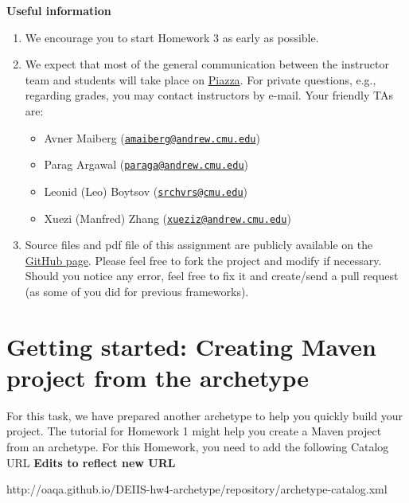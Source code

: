 \documentclass[oneside]{memoir}
\begin{document}
\textbf{Useful information}
\begin{enumerate}
\item We encourage you to start Homework 3 as early as possible.

\item 
We expect that most of the general communication between the instructor team and students will take place on 
\href{https://piazza.com/class/hyvsubeilei6dd}{Piazza}.
For private questions, e.g., regarding grades, you may contact instructors by e-mail.
Your friendly TAs are:
\begin{itemize}
\item Avner Maiberg (\href{mailto:amaiberg@andrew.cmu.edu}{\nolinkurl{amaiberg@andrew.cmu.edu}}) 
\item Parag Argawal (\href{mailto:paraga@andrew.cmu.edu}{\nolinkurl{paraga@andrew.cmu.edu}}) 
\item Leonid (Leo) Boytsov (\href{mailto:srchvrs@cmu.edu}{\nolinkurl{srchvrs@cmu.edu}})
\item Xuezi (Manfred) Zhang (\href{mailto:xueziz@andrew.cmu.edu}{\nolinkurl{xueziz@andrew.cmu.edu}}) 
\end{itemize}

\item Source files and pdf file of this assignment are publicly available on 
the  \href{http://github.com/amaiberg/software-engineering-preliminary}{GitHub page}.
Please feel free to fork the project and modify if necessary.
Should you notice any error, feel free to fix it and create/send a pull request (as some
of you did for previous frameworks).  

\end{enumerate}
\hspace{-0.1\textwidth}

\section*{Getting started: Creating Maven project from the archetype}
For this task, we have prepared another archetype to help you quickly build your project. 
The tutorial for Homework 1 might help you create a Maven project from an archetype.
For this Homework, you need to add the following Catalog URL 
\textbf{\color{red}Edits to reflect new URL}

http://oaqa.github.io/DEIIS-hw4-archetype/repository/archetype-catalog.xml
\end{document}
